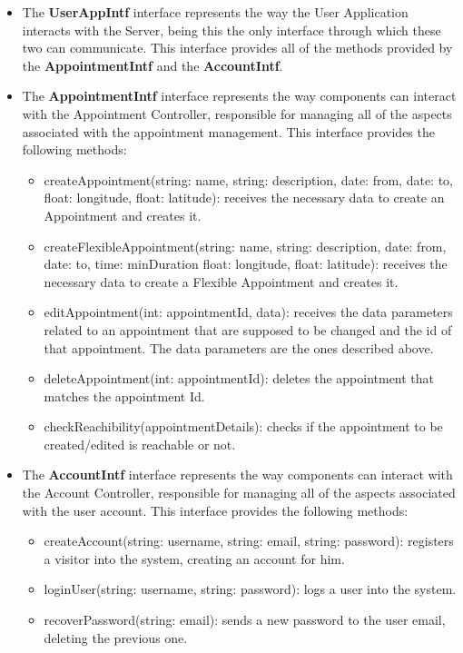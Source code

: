 \documentclass[12pt]{article}
\begin{document}
\begin{itemize}
    \item The \textbf{UserAppIntf} interface represents the way the User Application interacts with the Server, being this the only interface through which these two can communicate. This interface provides all of the methods provided by the \textbf{AppointmentIntf} and the \textbf{AccountIntf}.
    \item The \textbf{AppointmentIntf} interface represents the way components can interact with the Appointment Controller, responsible for managing all of the aspects associated with the appointment management. This interface provides the following methods:
    \begin{itemize}
        \item createAppointment(string: name, string: description, date: from, date: to, float: longitude, float: latitude): receives the necessary data to create an Appointment and creates it.
        \item createFlexibleAppointment(string: name, string: description, date: from, date: to, time: minDuration float: longitude, float: latitude): receives the necessary data to create a Flexible Appointment and creates it.
        \item editAppointment(int: appointmentId, data): receives the data parameters related to an appointment that are supposed to be changed and the id of that appointment. The data parameters are the ones described above.
        \item deleteAppointment(int: appointmentId): deletes the appointment that matches the appointment Id.
        \item checkReachibility(appointmentDetails): checks if the appointment to be created/edited is reachable or not.
    \end{itemize}
    \item The \textbf{AccountIntf} interface represents the way components can interact with the Account Controller, responsible for managing all of the aspects associated with the user account. This interface provides the following methods:
    \begin{itemize}
        \item createAccount(string: username, string: email, string: password): registers a visitor into the system, creating an account for him.
        \item loginUser(string: username, string: password): logs a user into the system.
         \item recoverPassword(string: email): sends a new password to the user email, deleting the previous one.

\end{itemize}
\end{itemize}
\end{document}
